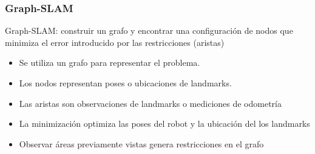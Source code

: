 \begin{frame}
    \frametitle{Graph-SLAM}
    
    Graph-SLAM: construir un grafo y encontrar una configuración de nodos que minimiza el error introducido por las restricciones (aristas)
    
    \begin{itemize}
        \item Se utiliza un grafo para representar el problema.
        \item Los nodos representan poses o ubicaciones de landmarks.
        \item Las aristas son observaciones de landmarks o mediciones de odometría
        \item La minimización optimiza las poses del robot y la ubicación del los landmarks
        \item Observar áreas previamente vistas genera restricciones en el grafo
    \end{itemize}

    \begin{figure}
    \hspace{1em}
    \end{figure}
    
\end{frame}


